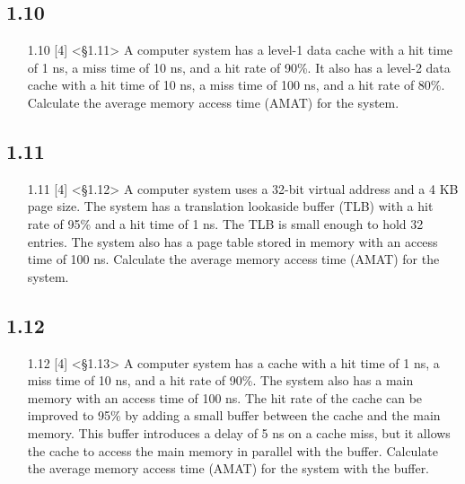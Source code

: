 \documentclass{article}
\begin{document}

\subsection*{1.10}
\begin{enumerate}
    \item[1.10] [4] <§1.11> A computer system has a level-1 data cache with a hit time of 1 ns, a miss time of 10 ns, and a hit rate of 90\%. It also has a level-2 data cache with a hit time of 10 ns, a miss time of 100 ns, and a hit rate of 80\%. Calculate the average memory access time (AMAT) for the system.
\end{enumerate}

\subsection*{1.11}
\begin{enumerate}
    \item[1.11] [4] <§1.12> A computer system uses a 32-bit virtual address and a 4 KB page size. The system has a translation lookaside buffer (TLB) with a hit rate of 95\% and a hit time of 1 ns. The TLB is small enough to hold 32 entries. The system also has a page table stored in memory with an access time of 100 ns. Calculate the average memory access time (AMAT) for the system.
\end{enumerate}

\subsection*{1.12}
\begin{enumerate}
    \item[1.12] [4] <§1.13> A computer system has a cache with a hit time of 1 ns, a miss time of 10 ns, and a hit rate of 90\%. The system also has a main memory with an access time of 100 ns. The hit rate of the cache can be improved to 95\% by adding a small buffer between the cache and the main memory. This buffer introduces a delay of 5 ns on a cache miss, but it allows the cache to access the main memory in parallel with the buffer. Calculate the average memory access time (AMAT) for the system with the buffer.
\end{enumerate}
\end{document}
